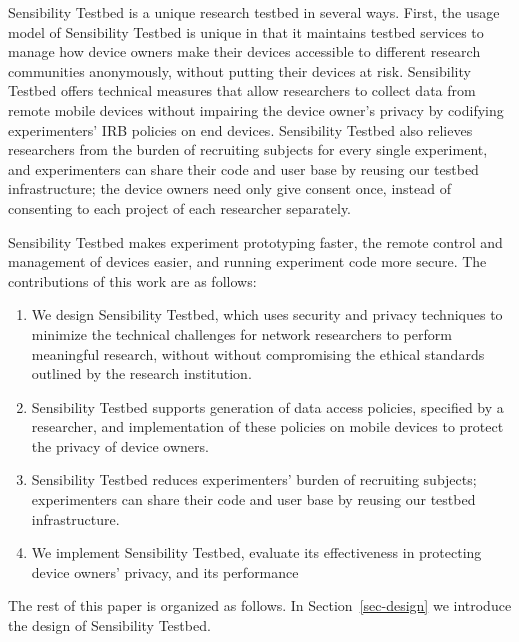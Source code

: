 Sensibility Testbed is a unique research testbed in several ways.
First, the usage model of Sensibility Testbed is
unique in that it maintains testbed services to manage how device 
owners make their devices accessible to different research 
communities anonymously, without putting
their devices at risk. Sensibility Testbed offers technical measures
that allow researchers to collect data from remote mobile
devices without impairing the device owner's privacy by codifying 
experimenters' IRB policies on end devices. 
Sensibility Testbed also relieves researchers from the burden of
recruiting subjects for every single experiment, and 
experimenters can share their code and user base by reusing
our testbed infrastructure; the device
owners need only give consent once, instead of 
consenting to each project of each researcher separately.

Sensibility Testbed makes experiment
prototyping faster, the remote control and management of devices
easier, and running experiment code more secure. The
contributions of this work are as follows:

\begin{enumerate}
\item We design Sensibility Testbed, which uses security and 
privacy techniques to minimize the technical challenges for 
network researchers to perform meaningful research, without 
without compromising the ethical standards outlined by the 
research institution.

\item Sensibility Testbed supports generation of data access 
policies, specified by a researcher, and implementation of 
these policies on mobile devices to protect the privacy of 
device owners.

\item Sensibility Testbed reduces experimenters' burden of 
recruiting subjects; experimenters can share their code and 
user base by reusing our testbed infrastructure.


\item We implement Sensibility Testbed, evaluate its effectiveness
in protecting device owners' privacy, and its performance 
\end{enumerate}

The rest of this paper is organized as follows. In Section~\ref{sec-design}
we introduce the design of Sensibility Testbed.
